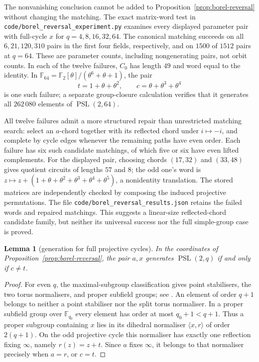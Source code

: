 \documentclass[11pt,a4paper]{article}
\newtheorem{lemma}[theorem]{Lemma}
\theoremstyle{definition}
\theoremstyle{remark}
\newcommand{\PSL}{\operatorname{PSL}}
\begin{document}
The nonvanishing conclusion cannot be added to Proposition~\ref{prop:borel-reversal} without changing the matching.  The exact matrix-word test in \texttt{code/borel\_reversal\_experiment.py} examines every displayed parameter pair with full-cycle $x$ for $q=4,8,16,32,64$.  The canonical matching succeeds on all $6,21,120,310$ pairs in the first four fields, respectively, and on $1500$ of $1512$ pairs at $q=64$.  These are parameter counts, including nongenerating pairs, not orbit counts.  In each of the twelve failures, $C_0$ has length $49$ and word equal to the identity.  In $\mathbb F_{64}=\mathbb F_2[\theta]/(\theta^6+\theta+1)$, the pair
\[
 t=1+\theta+\theta^2,\qquad c=\theta+\theta^3+\theta^4
\]
is one such failure; a separate group-closure calculation verifies that it generates all $262\,080$ elements of $\PSL(2,64)$.

All twelve failures admit a more structured repair than unrestricted matching search: select an $a$-chord together with its reflected chord under $i\mapsto-i$, and complete by cycle edges whenever the remaining paths have even order.  Each failure has six such candidate matchings, of which five or six have even lifted complements.  For the displayed pair, choosing chords $(17,32)$ and $(33,48)$ gives quotient circuits of lengths $57$ and $8$; the odd one's word is $z\mapsto z+(1+\theta+\theta^2+\theta^3+\theta^4+\theta^5)$, a nonidentity translation.  The stored matrices are independently checked by composing the induced projective permutations.  The file \texttt{code/borel\_reversal\_results.json} retains the failed words and repaired matchings.  This suggests a linear-size reflected-chord candidate family, but neither its universal success nor the full simple-group case is proved.

\begin{lemma}[generation for full projective cycles]\label{lem:borel-generation}
In the coordinates of Proposition~\ref{prop:borel-reversal}, the pair $a,x$ generates $\PSL(2,q)$ if and only if $c\ne t$.
\end{lemma}
\begin{proof}
For even $q$, the maximal-subgroup classification gives point stabilisers, the two torus normalisers, and proper subfield groups; see \cite[Theorem~7.17]{DGLP08}.  An element of order $q+1$ belongs to neither a point stabiliser nor the split torus normaliser.  In a proper subfield group over $\mathbb F_{q_0}$ every element has order at most $q_0+1<q+1$.  Thus a proper subgroup containing $x$ lies in its dihedral normaliser $\langle x,r\rangle$ of order $2(q+1)$.  On the odd projective cycle this normaliser has exactly one reflection fixing $\infty$, namely $r(z)=z+t$.  Since $a$ fixes $\infty$, it belongs to that normaliser precisely when $a=r$, or $c=t$.
\end{proof}
\end{document}
